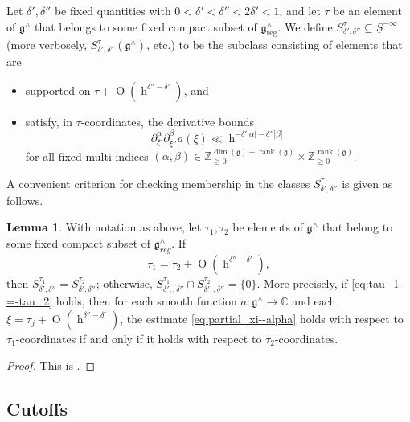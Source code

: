 \documentclass[reqno]{amsart}
\DeclareMathOperator{\h}{h}
\def\O{\operatorname{O}}
\DeclareMathOperator{\rank}{rank}
\DeclareMathOperator{\reg}{reg}
\theoremstyle{plain} \newtheorem{theorem} {Theorem}
\theoremstyle{definition} \newtheorem{definition} [theorem] {Definition}
\theoremstyle{itplain} %
\newtheorem{lemma}[theorem]{Lemma}
\numberwithin{equation}{section}
\numberwithin{theorem}{section}
\renewcommand{\geq}{\geqslant}
\begin{document}
Let $\delta ', \delta ''$ be fixed quantities with $0 < \delta ' < \delta '' < 2 \delta ' < 1$, and let $\tau$ be an element of $\mathfrak{g}^\wedge$ that belongs to some fixed compact subset of $\mathfrak{g}^\wedge_{\reg}$.  We define $S^{\tau}_{\delta ', \delta ''} \subseteq \underline{S}^{-\infty}$ (more verbosely, $S_{\delta ', \delta ''}^{\tau}(\mathfrak{g}^\wedge)$, etc.) to be the subclass consisting of elements that are   
\begin{itemize}
\item supported on $\tau + \O(\h^{ \delta '' - \delta '})$, and
\item satisfy, in $\tau$-coordinates, the derivative bounds
  \begin{equation}\label{eq:partial_xi--alpha}
    \partial_{\xi '} ^{\alpha } \partial _{\xi ''} ^{\beta } a (\xi) \ll \h ^{- \delta ' |\alpha| - \delta '' |\beta|}
  \end{equation}
  for all fixed multi-indices $(\alpha,\beta) \in \mathbb{Z}_{\geq 0}^{\dim(\mathfrak{g}) - \rank(\mathfrak{g})} \times \mathbb{Z}_{\geq 0}^{\rank(\mathfrak{g})}$.
\end{itemize}
A convenient criterion for checking membership in the classes $S^\tau_{\delta ', \delta ''}$ is given as follows.
\begin{lemma}\label{lem:basepoint-insensitivity}
  With notation as above, let $\tau_1, \tau_2$ be elements of $\mathfrak{g}^\wedge$ that belong to some fixed compact subset of $\mathfrak{g}^\wedge_{reg}$.  If
  \begin{equation}\label{eq:tau_1-=-tau_2}
    \tau_1 = \tau_2 + \O (\h^{\delta '' - \delta '}),
  \end{equation}
  then $S_{\delta ', \delta ''}^{\tau_1} = S_{\delta ', \delta ''}^{\tau_2}$; otherwise, $S^{\tau_1}_{\delta', , \delta ''} \cap S^{\tau_2}_{\delta', , \delta ''} = \{0\}$.  More precisely, if \eqref{eq:tau_1-=-tau_2} holds, then for each smooth function $a : \mathfrak{g}^\wedge \rightarrow \mathbb{C}$ and each $\xi = \tau_j + \O (\h^{\delta '' - \delta '})$, the estimate \eqref{eq:partial_xi--alpha} holds with respect to $\tau_1$-coordinates if and only if it holds with respect to $\tau_2$-coordinates.
\end{lemma}
\begin{proof}
  This is \cite[Lemma 9.9]{2020arXiv201202187N}.
\end{proof}

\subsection{Cutoffs}
\end{document}
